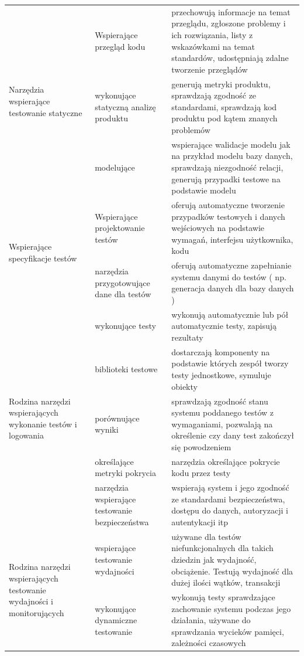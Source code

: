 \begin{longtable}{| p{4cm} | p{4cm} | p{8cm} |}
\multirow{3}{4cm}{Narzędzia wspierające testowanie statyczne} &
Wspierające przegląd kodu & przechowują informacje na temat przeglądu, zgłoszone problemy i ich rozwiązania, listy z wskazówkami na temat standardów, udostępniają zdalne tworzenie przeglądów\\ \cline{2-3}
& wykonujące statyczną analizę produktu & generują metryki produktu, sprawdzają zgodność ze standardami, sprawdzają kod produktu pod kątem znanych problemów\\ \cline{2-3}
&  modelujące  & wspierające walidacje modelu jak na przykład modelu bazy danych, sprawdzają niezgodność relacji, generują przypadki testowe na podstawie modelu\\ \hline
\hline
\multirow{2}{4cm}{Wspierające specyfikacje testów} &
Wspierające projektowanie testów & oferują automatyczne tworzenie przypadków testowych i danych wejściowych na podstawie wymagań, interfejsu użytkownika, kodu\\ \cline{2-3}
& narzędzia przygotowujące dane dla testów & oferują automatyczne zapełnianie systemu danymi do testów ( np. generacja danych dla bazy danych )\\ \cline{2-3}
\hline
\multirow{5}{4cm}{Rodzina narzędzi wspierających wykonanie testów i logowania} &
wykonujące testy & wykonują automatycznie lub pół automatycznie testy, zapisują rezultaty\\ \cline{2-3}
& biblioteki testowe & dostarczają komponenty na podstawie których zespół tworzy testy jednostkowe, symuluje obiekty\\ \cline{2-3}
&  porównujące wyniki & sprawdzają zgodność stanu systemu poddanego testów z wymaganiami, pozwalają na określenie czy dany test zakończył się powodzeniem\\ \cline{2-3}
& określające metryki pokrycia & narzędzia określające pokrycie kodu przez testy \\ \cline{2-3}
& narzędzia wspierające testowanie bezpieczeństwa & wspierają system i jego zgodność ze standardami bezpieczeństwa, dostępu do danych, autoryzacji i autentykacji itp\\ \hline
\hline
\multirow{5}{4cm}{Rodzina narzędzi wspierających testowanie wydajności i monitorujących}&
 wspierające testowanie wydajności & używane dla testów niefunkcjonalnych dla takich dziedzin jak wydajność, obciążenie. Testują wydajność dla dużej ilości wątków, transakcji \\ \cline{2-3}
& wykonujące dynamiczne testowanie & wykonują testy sprawdzające zachowanie systemu podczas jego działania, używane do sprawdzania wycieków pamięci, zależności czasowych \\ \cline{2-3}

\end{longtable}
